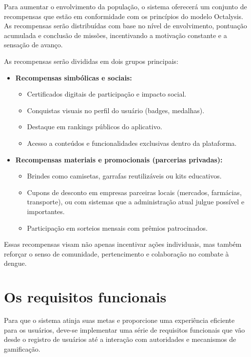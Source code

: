 \documentclass[a5paper, 12pt]{article}
\begin{document}
Para aumentar o envolvimento da população, o sistema oferecerá um conjunto de recompensas que estão em conformidade com os princípios do modelo Octalysis. As recompensas serão distribuídas com base no nível de envolvimento, pontuação acumulada e conclusão de missões, incentivando a motivação constante e a sensação de avanço.

As recompensas serão divididas em dois grupos principais:

\begin{itemize}
    \item \textbf{Recompensas simbólicas e sociais:}
    \begin{itemize}
        \item Certificados digitais de participação e impacto social.
        \item Conquistas visuais no perfil do usuário (badges, medalhas).
        \item Destaque em rankings públicos do aplicativo.
        \item Acesso a conteúdos e funcionalidades exclusivas dentro da plataforma.
    \end{itemize}

    \item \textbf{Recompensas materiais e promocionais (parcerias privadas):}
    \begin{itemize}
        \item Brindes como camisetas, garrafas reutilizáveis ou kits educativos.
        \item Cupons de desconto em empresas parceiras locais (mercados, farmácias, transporte), ou com sistemas que a administração atual julgue possível e importantes.
        \item Participação em sorteios mensais com prêmios patrocinados.
    \end{itemize}
\end{itemize}

Essas recompensas visam não apenas incentivar ações individuais, mas também reforçar o senso de comunidade, pertencimento e colaboração no combate à dengue.

\section{Os requisitos funcionais}
\label{sec:req}

Para que o sistema atinja suas metas e proporcione uma experiência eficiente para os usuários, deve-se implementar uma série de requisitos funcionais que vão desde o registro de usuários até a interação com autoridades e mecanismos de gamificação.
\end{document}
